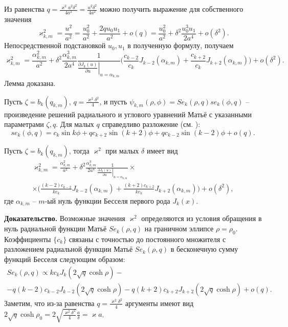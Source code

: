Из равенства $q=\frac{\varkappa^2 a^2 \delta^2}{4 a^2}=\frac{u^2 \delta^2}{4a^2}$ можно получить выражение для собственного значения
$$\varkappa_{k, m}^2 = \frac{u^2}{a^2} = \frac{u_0^2}{a^2} + \frac{2 q u_0 u_1}{a^2} + o(q)= \frac{u_0^2}{a^2} +  \delta^2 \frac{u_0^3 u_1}{2 a^4} + o(\delta^2).$$ 
Непосредственной подстановкой $u_0, u_1$ в полученную формулу, получаем
$$\varkappa_{k, m}^2 = 
\frac{\alpha_{k, m}^2}{a^2} +  \delta^2 \frac{\alpha_{k, m}^3}{2 a^4}\frac{1}{\left.\frac{\partial J_{k} (u)}{\partial u}\right|_{u=\alpha_{k, m}}} 
\biggl(
\frac{c_{k-2}}{c_k} J_{k-2}(\alpha_{k, m}) + \frac{c_{k+2} }{c_k} J_{k+2}(\alpha_{k, m})
\biggr) + o(\delta^2).
$$ 
Лемма доказана.

Пусть $\zeta = b_k(q_{k,m})$, $q=\frac{\varkappa^2 \delta^2}{4}$, и пусть 
$\psi_{k,m}(\rho, \phi) = Se_k(\rho, q)se_k(\phi, q)$ -- произведение решений радиального и углового уравнений Матьё с указанными параметрами $\zeta, q$. Для малых $q$ справедливо разложение (см. \cite[\S~2.2, с.~122---124]{wref12}):
$$se_k(\phi, q) = c_k \sin{k \phi} + q c_{k+2} \sin{(k+2) \phi} +q c_{k-2} \sin{(k-2) \phi} + o(q).$$ 
\begin{lemma}
Пусть $\zeta = b_k(q_{k, m})$, тогда $\varkappa^2$ при малых $\delta$ имеет вид
\begin{multline*}
\varkappa_{k, m}^2 = 
\frac{\alpha_{k, m}^2}{a^2} +  \delta^2 \frac{\alpha_{k, m}^3}{2 a^4}\frac{1}{\left.\frac{\partial J_{k} (u)}{\partial u}\right|_{u=\alpha_{k, m}}} \times \\ \times
\biggl(
\frac{(k-2)c_{k-2}}{k c_k} J_{k-2}(\alpha_{k, m}) + \frac{(k+2)c_{k+2} }{k c_k} J_{k+2}(\alpha_{k, m})
\biggr) + o(\delta^2),
\end{multline*}
где $\alpha_{k, m}$ -- $m$-ый нуль функции Бесселя первого рода $J_{k}(x)$.
\label{th:lemEllipse2}
\end{lemma}
\textbf{Доказательство.}
Возможные значения $\varkappa^2$ определяются из условия обращения в нуль радиальной функции Матьё $Se_k(\rho, q)$ на граничном эллипсе $\rho = \rho_0$.
Коэффициенты $\{c_k\}$ связаны \cite{wref2} с точностью до постоянного множителя с разложением радиальной функции Матьё $Se_k(\rho, q)$ в бесконечную сумму функций Бесселя следующим образом:
\begin{multline*}
Se_k(\rho, q) \propto 
	k c_k J_k(2\sqrt{q}\cosh{\rho}) - \\
	- q (k-2) c_{k-2} J_{k-2}(2\sqrt{q}\cosh{\rho}) -
	q (k+2) c_{k+2} J_{k+2}(2\sqrt{q}\cosh{\rho}) + o(q).
\end{multline*}
Заметим, что из-за равенства $q = \frac{\varkappa^2\delta^2}{4}$ аргументы имеют вид $2 \sqrt{q} \cosh{\rho_0} = 2 \sqrt{\frac{\varkappa^2 \delta^2}{4}} \frac{a}{\delta} = \varkappa a$. 
